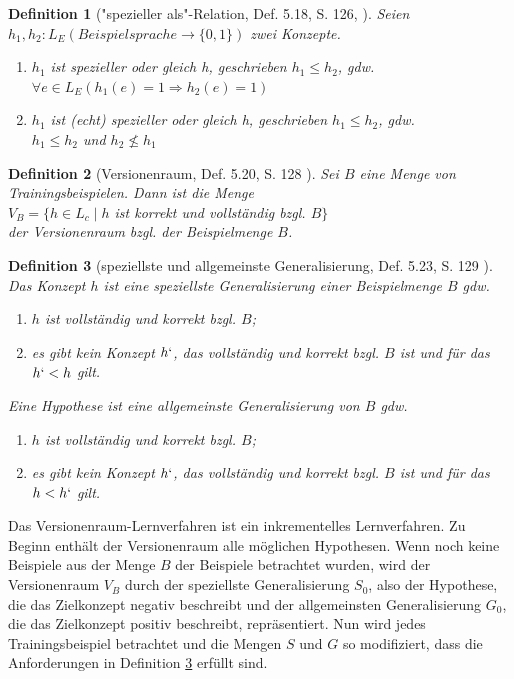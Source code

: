 \documentclass[a4paper, 11pt]{book}
\newtheorem{Def}{Definition }[section]
\begin{document}
{\begin{Def}["{}spezieller als"{}-Relation, Def. 5.18, S. 126, \cite{BKI08}]
	Seien $ h_1, h_2 : L_E (Beispielsprache \rightarrow \{0,1\}) $ zwei Konzepte.
	\begin{enumerate}
		\item $ h_1 $ ist spezieller oder gleich h, geschrieben $ h_1 \le h_2 $, gdw. \\
		$ \forall e \in L_E(h_1(e) = 1 \Rightarrow h_2(e) = 1) $
			\item $ h_1 $ ist (echt) spezieller oder gleich h, geschrieben $ h_1 \leq h_2 $, gdw. \\
		$ h_1 \leq h_2 $ und $ h_2 \not \le h_1 $
	\end{enumerate} 
\end{Def}
\begin{Def}[Versionenraum, Def. 5.20, S. 128 \cite{BKI08}]
	Sei $ B $ eine Menge von Trainingsbeispielen. Dann ist die Menge\\
	$ V_B = \{h \in L_ c \mid h $  ist korrekt und vollständig bzgl. $ B \} $\\
	der Versionenraum bzgl. der Beispielmenge $ B $.
\end{Def}
\begin{Def}[speziellste und allgemeinste Generalisierung, Def. 5.23, S. 129 \cite{BKI08}] \label{spezGen}
Das Konzept  $ h $ ist eine speziellste Generalisierung einer Beispielmenge $ B $ gdw.
\begin{enumerate}
	\item $ h $ ist vollständig und korrekt bzgl. $ B $;
	\item es gibt kein Konzept $ h` $, das vollständig und korrekt bzgl. $ B $ ist und für das $ h` <  h $ gilt.
\end{enumerate}
Eine Hypothese ist eine allgemeinste Generalisierung von $ B $ gdw.
\begin{enumerate}
	\item $ h $ ist vollständig und korrekt bzgl. $ B $;
	\item es gibt kein Konzept $ h` $, das vollständig und korrekt bzgl. $ B $ ist und für das $ h <  h` $ gilt.
\end{enumerate}
\end{Def}
Das Versionenraum-Lernverfahren ist ein inkrementelles Lernverfahren. Zu Beginn enthält der Versionenraum alle möglichen Hypothesen. Wenn noch keine Beispiele aus der Menge $ B $ der Beispiele betrachtet wurden, wird der Versionenraum $ V_B $ durch der speziellste Generalisierung $ S_0 $, also der Hypothese, die das Zielkonzept negativ beschreibt und der allgemeinsten Generalisierung $ G_0 $, die das Zielkonzept positiv beschreibt, repräsentiert. Nun wird jedes Trainingsbeispiel betrachtet und die Mengen $ S $ und $ G $ so modifiziert, dass die Anforderungen in Definition \ref{spezGen} erfüllt sind.
}
\end{document}
